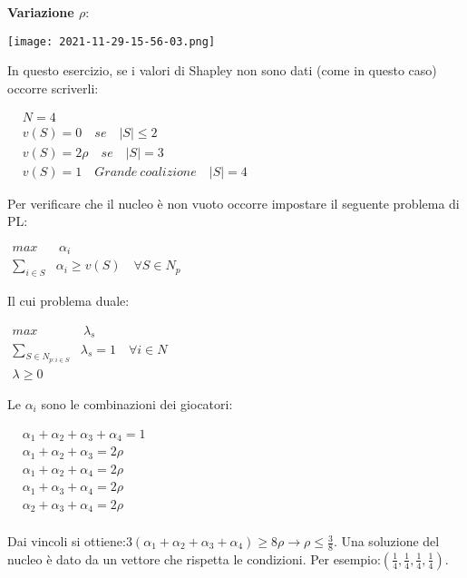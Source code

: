 \documentclass{article}
\theoremstyle{definition}
\theoremstyle{remark}
\begin{document}
\textbf{Variazione \(\rho\)}:
\begin{center}
    \texttt{[image: 2021-11-29-15-56-03.png]}
\end{center}
In questo esercizio, se i valori di Shapley non sono dati (come in questo caso) occorre scriverli:
\begin{center}
    $\begin{aligned}
        & N=4 \\
        & v(S)=0\quad se\quad |S|\leq 2 \\
        & v(S)=2\rho\quad se\quad |S|=3 \\
        & v(S)=1\quad Grande\ coalizione\quad |S|=4
    \end{aligned}$
\end{center}
Per verificare che il nucleo è non vuoto occorre impostare il seguente problema di PL:
\begin{center}
    $\begin{aligned}
        max &\ \alpha_i\\
        \sum_{i\in S}& \alpha_i\geq v(S)\quad \forall S\in N_p
    \end{aligned}$
\end{center}
Il cui problema duale:
\begin{center}
    $\begin{aligned}
        max &\ \lambda_s\\
        \sum_{S\in N_{p:i\in S}}& \lambda_s= 1\quad \forall i\in N\\
        \lambda\geq 0
    \end{aligned}$
\end{center}
Le \(\alpha_i\) sono le combinazioni dei giocatori:
\begin{center}
    $\begin{aligned}
        & \alpha_1+\alpha_2+\alpha_3+\alpha_4=1\\
        & \alpha_1 +\alpha_2+\alpha_3=2\rho\\
        & \alpha_1 +\alpha_2+\alpha_4=2\rho\\
        & \alpha_1 +\alpha_3+\alpha_4=2\rho\\
        & \alpha_2 +\alpha_3+\alpha_4=2\rho\\
    \end{aligned}$
\end{center}
Dai vincoli si ottiene:\(3(\alpha_1+\alpha_2+\alpha_3+\alpha_4)\geq 8\rho\rightarrow\rho\leq\frac{3}{8}\).\newline
Una soluzione del nucleo è dato da un vettore che rispetta le condizioni. Per esempio:\((\frac{1}{4},\frac{1}{4},\frac{1}{4},\frac{1}{4})\).\newline
\end{document}
